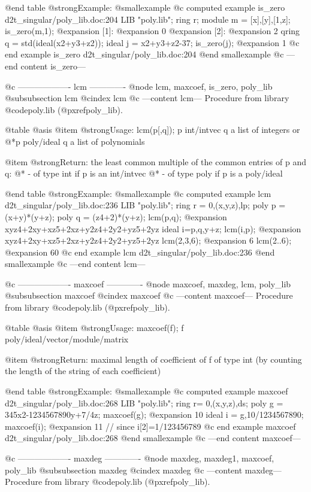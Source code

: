 @end table
@strong{Example:}
@smallexample
@c computed example is_zero d2t_singular/poly_lib.doc:204 
LIB "poly.lib";
ring r;
module m = [x],[y],[1,z];
is_zero(m,1);
@expansion{} [1]:
@expansion{}    0
@expansion{} [2]:
@expansion{}    2
qring q = std(ideal(x2+y3+z2));
ideal j = x2+y3+z2-37;
is_zero(j);
@expansion{} 1
@c end example is_zero d2t_singular/poly_lib.doc:204
@end smallexample
@c ---end content is_zero---

@c ------------------- lcm -------------
@node lcm, maxcoef, is_zero, poly_lib
@subsubsection lcm
@cindex lcm
@c ---content lcm---
Procedure from library @code{poly.lib} (@pxref{poly_lib}).

@table @asis
@item @strong{Usage:}
lcm(p[,q]); p int/intvec q a list of integers or
@*p poly/ideal q a list of polynomials

@item @strong{Return:}
the least common multiple of the common entries of p and q:
@* - of type int if p is an int/intvec
@* - of type poly if p is a poly/ideal

@end table
@strong{Example:}
@smallexample
@c computed example lcm d2t_singular/poly_lib.doc:236 
LIB "poly.lib";
ring  r = 0,(x,y,z),lp;
poly  p = (x+y)*(y+z);
poly  q = (z4+2)*(y+z);
lcm(p,q);
@expansion{} xyz4+2xy+xz5+2xz+y2z4+2y2+yz5+2yz
ideal i=p,q,y+z;
lcm(i,p);
@expansion{} xyz4+2xy+xz5+2xz+y2z4+2y2+yz5+2yz
lcm(2,3,6);
@expansion{} 6
lcm(2..6);
@expansion{} 60
@c end example lcm d2t_singular/poly_lib.doc:236
@end smallexample
@c ---end content lcm---

@c ------------------- maxcoef -------------
@node maxcoef, maxdeg, lcm, poly_lib
@subsubsection maxcoef
@cindex maxcoef
@c ---content maxcoef---
Procedure from library @code{poly.lib} (@pxref{poly_lib}).

@table @asis
@item @strong{Usage:}
maxcoef(f); f poly/ideal/vector/module/matrix

@item @strong{Return:}
maximal length of coefficient of f of type int (by counting the
length of the string of each coefficient)

@end table
@strong{Example:}
@smallexample
@c computed example maxcoef d2t_singular/poly_lib.doc:268 
LIB "poly.lib";
ring r= 0,(x,y,z),ds;
poly g = 345x2-1234567890y+7/4z;
maxcoef(g);
@expansion{} 10
ideal i = g,10/1234567890;
maxcoef(i);
@expansion{} 11
// since i[2]=1/123456789
@c end example maxcoef d2t_singular/poly_lib.doc:268
@end smallexample
@c ---end content maxcoef---

@c ------------------- maxdeg -------------
@node maxdeg, maxdeg1, maxcoef, poly_lib
@subsubsection maxdeg
@cindex maxdeg
@c ---content maxdeg---
Procedure from library @code{poly.lib} (@pxref{poly_lib}).

